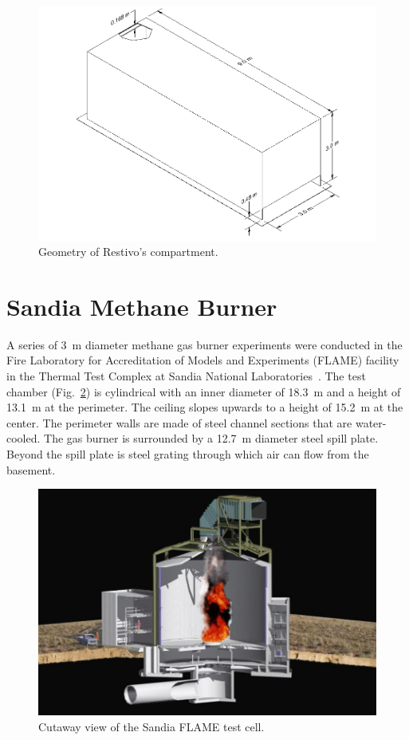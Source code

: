 \begin{figure}[ht]
\includegraphics[width=\textwidth]{FIGURES/Restivo_Experiment/Restivo_Drawing}
\caption[Geometry of Restivo's compartment]{Geometry of Restivo's compartment.}
\label{Restivo_Drawing}
\end{figure}

\section{Sandia Methane Burner}
\label{Sandia_Methane_Burner_Description}

A series of 3~m diameter methane gas burner experiments were conducted in the Fire Laboratory for Accreditation of Models and Experiments (FLAME) facility in the Thermal Test Complex at Sandia National Laboratories~\cite{Blanchat:2011}. The test chamber (Fig.~\ref{FRH_Cutaway}) is cylindrical with an inner diameter of 18.3~m and a height of 13.1~m at the perimeter. The ceiling slopes upwards to a height of 15.2~m at the center. The perimeter walls are made of steel channel sections that are water-cooled. The gas burner is surrounded by a 12.7~m diameter steel spill plate. Beyond the spill plate is steel grating through which air can flow from the basement.

\begin{figure}[!ht]
\includegraphics[width=\textwidth]{FIGURES/Sandia_Methane_Burner/FRH_Cutaway}
\caption[Cutaway view of the Sandia FLAME test cell]{Cutaway view of the Sandia FLAME test cell.}
\label{FRH_Cutaway}
\end{figure}

